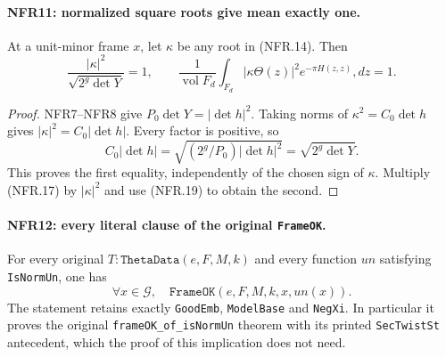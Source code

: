 \paragraph{NFR11: normalized square roots give mean exactly one.}
\label{claim:NFR11}
At a unit-minor frame $x$, let $\kappa$ be any root in (NFR.14).
Then
\[
 \frac{|\kappa|^2}{\sqrt{2^g\det Y}}=1,\qquad
 \frac1{\operatorname{vol}F_d}\int_{F_d}
  |\kappa\Theta(z)|^2e^{-\pi H(z,z)},dz=1.            \tag{NFR.20}
\]

\begin{proof}
NFR7--NFR8 give $P_0\det Y=|\det h|^2$.
Taking norms of $\kappa^2=C_0\det h$ gives
$|\kappa|^2=C_0|\det h|$.
Every factor is positive, so
\[
 C_0|\det h|=\sqrt{(2^g/P_0)|\det h|^2}
                        =\sqrt{2^g\det Y}.
\]
This proves the first equality, independently of the chosen sign
of $\kappa$.  Multiply (NFR.17) by $|\kappa|^2$ and use
(NFR.19) to obtain the second.
\end{proof}

\paragraph{NFR12: every literal clause of the original \texttt{FrameOK}.}
\label{claim:NFR12}
For every original $T:\texttt{ThetaData}(e,F,M,k)$ and every
function $un$ satisfying \texttt{IsNormUn}, one has
\[
                  \forall x\in\mathcal G,\quad
                     \texttt{FrameOK}(e,F,M,k,x,un(x)).
 \tag{NFR.21}
\]
The statement retains exactly \texttt{GoodEmb}, \texttt{ModelBase}
and \texttt{NegXi}.  In particular it proves the original
\texttt{frameOK\_of\_isNormUn} theorem with its printed
\texttt{SecTwistSt} antecedent, which the proof of this implication
does not need.


